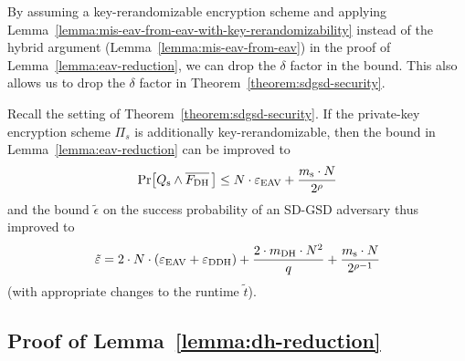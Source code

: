 By assuming a key-rerandomizable encryption scheme and applying Lemma~\ref{lemma:mis-eav-from-eav-with-key-rerandomizability} instead of the hybrid argument (Lemma~\ref{lemma:mis-eav-from-eav}) in the proof of Lemma~\ref{lemma:eav-reduction}, we can drop the $\delta$ factor in the bound. This also allows us to drop the $\delta$ factor in Theorem~\ref{theorem:sdgsd-security}.

\begin{corollary}
	Recall the setting of Theorem~\ref{theorem:sdgsd-security}. If the private-key encryption scheme $\Pi_s$ is additionally key-rerandomizable, then the bound in Lemma~\ref{lemma:eav-reduction} can be improved to
	\[
		\pr{\qs \land \overline{\fdh}\,} \le N \cdot \eeav + \frac{\ms \cdot N}{2^\rho}
	\]
	and the bound $\tilde{\epsilon}$ on the success probability of an SD-GSD adversary thus improved to
	\[
		\tilde{\varepsilon} = 2 \cdot N \cdot (\varepsilon_\mathrm{EAV} + \varepsilon_\mathrm{DDH}) + \frac{2 \cdot m_\mathrm{DH} \cdot N^2}{q} + \frac{m_\mathrm{s} \cdot N}{2^{\rho - 1}}
	\]
	(with appropriate changes to the runtime $\tilde{t}$).
\end{corollary}

\subsection{Proof of Lemma~\ref{lemma:dh-reduction}} \label{sec:dh-reduction-proof}


